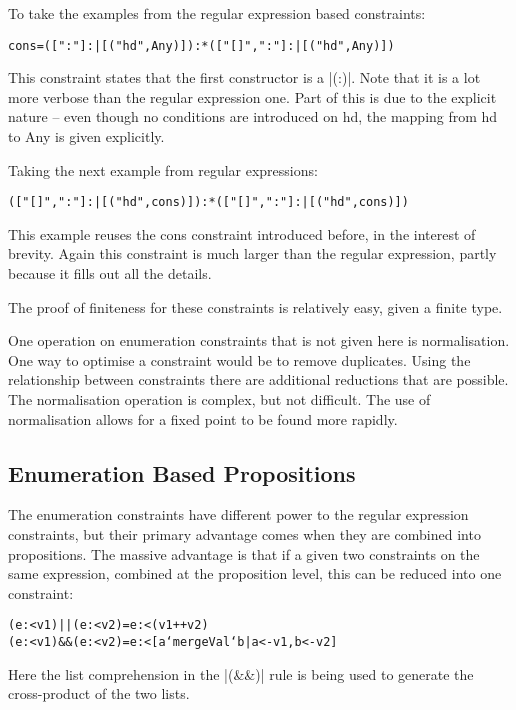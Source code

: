 \documentclass[preprint]{sigplanconf}
\newcommand{\C}[1]{\textsf{#1}}
\newenvironment{code}{\begin{alltt}\small}{\end{alltt}}
\begin{document}
To take the examples from the regular expression based constraints:

\begin{code}
cons = ([":"] :| [("hd",Any)]) :* (["[]",":"] :| [("hd",Any)])
\end{code}

This constraint states that the first constructor is a |(:)|. Note that it is a lot more verbose than the regular expression one. Part of this is due to the explicit nature -- even though no conditions are introduced on \C{hd}, the mapping from \C{hd} to \C{Any} is given explicitly.

Taking the next example from regular expressions:

\begin{code}
(["[]",":"] :| [("hd",cons)]) :* (["[]",":"] :| [("hd",cons)])
\end{code}

This example reuses the \C{cons} constraint introduced before, in the interest of brevity. Again this constraint is much larger than the regular expression, partly because it fills out all the details.

The proof of finiteness for these constraints is relatively easy, given a finite type.

One operation on enumeration constraints that is not given here is normalisation. One way to optimise a constraint would be to remove duplicates. Using the relationship between constraints there are additional reductions that are possible. The normalisation operation is complex, but not difficult. The use of normalisation allows for a fixed point to be found more rapidly.

\subsection{Enumeration Based Propositions}

The enumeration constraints have different power to the regular expression constraints, but their primary advantage comes when they are combined into propositions. The massive advantage is that if a given two constraints on the same expression, combined at the proposition level, this can be reduced into one constraint:

\begin{code}
(e :< v1) || (e :< v2) = e :< (v1 ++ v2)
(e :< v1) && (e :< v2) = e :< [a `mergeVal` b | a <- v1, b <- v2]
\end{code}

Here the list comprehension in the |(&&)| rule is being used to generate the cross-product of the two lists.
\end{document}
